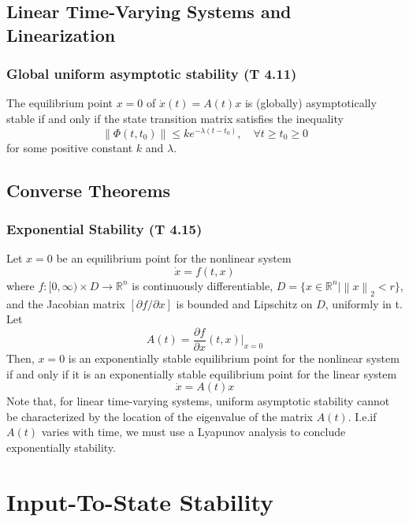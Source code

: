 \documentclass{article}
\begin{document}
\subsection{Linear Time-Varying Systems and Linearization}
\subsubsection{Global uniform asymptotic stability (T 4.11)}
The equilibrium point $x=0$ of $\dot x(t) = A(t) x$ is (globally) asymptotically stable if and only if the state transition matrix satisfies the inequality
\begin{equation*}
	\left\| \Phi(t,t_0) \right\| \leq k e^{- \lambda (t-t_0)}, \quad \forall t \geq t_0 \geq 0
\end{equation*}
for some positive constant $k$ and $\lambda$.
\subsection{Converse Theorems}
\subsubsection{Exponential Stability (T 4.15)}
Let $x=0$ be an equilibrium point for the nonlinear system
\begin{equation*}
	\dot x = f(t,x)
\end{equation*}
where $f : [0, \infty) \times D \to \mathbb{R}^{n}$ is continuously differentiable, $D = \{x \in  \mathbb{R}^n | \left\| x \right\|_2 < r\}$, and the Jacobian matrix $[\partial f / \partial x]$ is bounded and Lipschitz on $D$, uniformly in t.\\
Let
\begin{equation*}
	A(t) = \frac{\partial f}{\partial x}(t,x)|_{x=0}
\end{equation*}
Then, $x=0$ is an exponentially stable equilibrium point for the nonlinear system if and only if it is an exponentially stable equilibrium point for the linear system
\begin{equation*}
	\dot x = A(t) x
\end{equation*}
Note that, for linear time-varying systems, uniform asymptotic stability cannot be characterized by the location of the eigenvalue of the matrix $A(t)$. I.e.if $A(t)$ varies with time, we must use a Lyapunov analysis to conclude exponentially stability.
\section{Input-To-State Stability}
\end{document}
